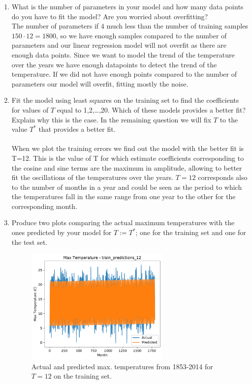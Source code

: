 \documentclass[12pt,twoside]{article}
\begin{document}
\begin{enumerate}
  \begin{enumerate}
  \item What is the number of parameters in your model and how many data points do you have to fit the model? Are you worried about overfitting?\\
  The number of parameters if $4$ much less than the number of training samples $150\cdot 12 = 1800$, so we have enough samples compared to the number of parameters and our linear regression model will not overfit as there are enough data points.
  Since we want to model the trend of the temperature over the years we have enough datapoints to detect the trend of the  temperature. If we did not have enough points compared to the number of parameters our model will overfit, fitting mostly the noise.
  
  \item Fit the model using least squares on the training set to
    find the coefficients for values of $T$ equal to 1,2,\ldots,20. Which of these models provides a better fit? Explain why this is the case. In the remaining question we will fix $T$ to the value $T^{\ast}$ that provides a better fit.\\ \\

    When we plot the training errors we find out the model with the better fit is T=12. This is the value of T for which estimate coefficients  corresponding to the cosine and sine  terms
    are the maximum in amplitude, allowing to better fit the oscillations of the temperatures over the years. $T=12$ corresponds also to the number of months in a year and could be seen as the period to which the temperatures fall in  
    the same range from one year to the other for the corresponding month.
    
  \item Produce two plots comparing the actual maximum temperatures with
    the ones predicted by your model for $T:=T^{\ast}$; one for the training set and one for the test set. \\
    
	\begin{figure}[H]
		\centering
		\includegraphics[width=200pt]{code/Q2/train_predictions_12_fit.pdf}
		\caption{Actual and predicted max. temperatures from 1853-2014 \newline for $T=12$ on the training set.}
	\end{figure}


\end{enumerate}
\end{enumerate}
\end{document}
